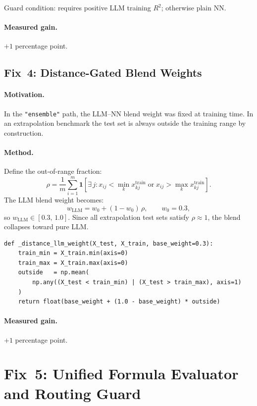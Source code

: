\documentclass[twoside,11pt]{article}
\begin{document}
Guard condition: requires positive LLM training $R^2$; otherwise plain NN.

\paragraph{Measured gain.} $+1$ percentage point.

\subsection{Fix~4: Distance-Gated Blend Weights}

\paragraph{Motivation.}
In the \texttt{"ensemble"} path, the LLM--NN blend weight was fixed at training
time.  In an extrapolation benchmark the test set is always outside the
training range by construction.

\paragraph{Method.}
Define the out-of-range fraction:
\[
  \rho = \frac{1}{m}\sum_{i=1}^{m}
         \mathbf{1}\!\left[
           \exists\,j : x_{ij} < \min_k x_{kj}^{\text{train}}
                       \;\text{or}\;
                       x_{ij} > \max_k x_{kj}^{\text{train}}
         \right].
\]
The LLM blend weight becomes:
\[
  w_{\text{LLM}} = w_0 + (1-w_0)\,\rho, \qquad w_0 = 0.3,
\]
so $w_{\text{LLM}} \in [0.3,\,1.0]$.  Since all extrapolation test sets satisfy
$\rho \approx 1$, the blend collapses toward pure LLM.

\begin{lstlisting}[caption={Distance-gated blend weight.}]
def _distance_llm_weight(X_test, X_train, base_weight=0.3):
    train_min = X_train.min(axis=0)
    train_max = X_train.max(axis=0)
    outside   = np.mean(
        np.any((X_test < train_min) | (X_test > train_max), axis=1)
    )
    return float(base_weight + (1.0 - base_weight) * outside)
\end{lstlisting}

\paragraph{Measured gain.} $+1$ percentage point.

\section{Fix~5: Unified Formula Evaluator and Routing Guard}
\label{sec:fix5}
\end{document}
